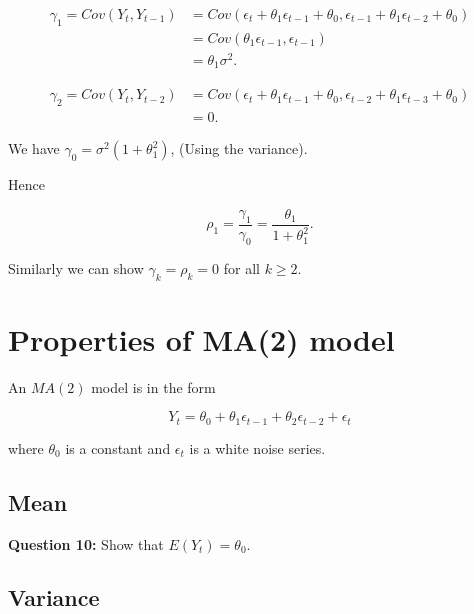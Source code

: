 \documentclass[
  11pt,
  a4paper,
]{report}
\begin{document}
\begin{equation}
\begin{aligned}
\gamma_1 = Cov(Y_t, Y_{t-1}) &= Cov(\epsilon_t + \theta_1 \epsilon_{t-1}+ \theta_0, \epsilon_{t-1}+\theta_1 \epsilon_{t-2} + \theta_0)\\
&=Cov(\theta_1 \epsilon_{t-1}, \epsilon_{t-1})\\
&=\theta_1 \sigma^2.
\end{aligned}
\end{equation}

\begin{equation}
\begin{aligned}
\gamma_2=Cov(Y_t, Y_{t-2}) &= Cov(\epsilon_t + \theta_1 \epsilon_{t-1}+ \theta_0, \epsilon_{t-2}+\theta_1 \epsilon_{t-3} + \theta_0)\\
&=0.
\end{aligned}
\end{equation}

We have \(\gamma_0=\sigma^2(1+\theta_1^2)\), (Using the variance).

Hence

\[\rho_1=\frac{\gamma_1}{\gamma_0}=\frac{\theta_1}{1+\theta_1^2}.\]

Similarly we can show \(\gamma_k=\rho_k=0\) for all \(k \geq 2\).

\section{Properties of MA(2) model}\label{properties-of-ma2-model}

An \(MA(2)\) model is in the form

\begin{equation}
Y_t = \theta_0 + \theta_1 \epsilon_{t-1} + \theta_2 \epsilon_{t-2} + \epsilon_t
\end{equation}

where \(\theta_0\) is a constant and \({\epsilon_t}\) is a white noise
series.

\subsection{Mean}\label{mean-4}

\textbf{Question 10: } Show that \(E(Y_t) = \theta_0.\)

\subsection{Variance}\label{variance-3}
\end{document}
